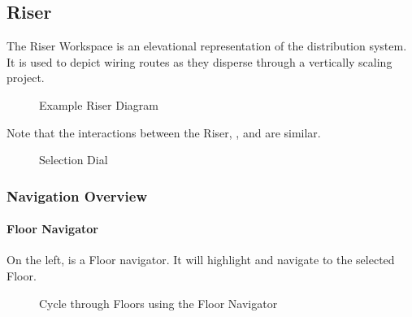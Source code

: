 \documentclass[letterpaper,10pt,english]{sphinxmanual}
\begin{document}
\subsection{Riser}
\label{\detokenize{docs/userguide/index-user_guide:riser}}\label{\detokenize{docs/userguide/buildingelectricalmodel/riser/index-riser:riser}}
The Riser Workspace is an elevational representation of the distribution system.  It is used to depict wiring routes as they disperse through a vertically scaling project.

\begin{figure}[H]
\centering
\capstart

\noindent{}
\caption{Example Riser Diagram}\label{\detokenize{docs/userguide/buildingelectricalmodel/riser/index-riser:id3}}\end{figure}

Note that the interactions between the Riser, {\hyperref[\detokenize{docs/userguide/buildingelectricalmodel/one-line/index-one-line:one-line}]{}}, and {\hyperref[\detokenize{docs/userguide/buildingelectricalmodel/schedules/index-schedules:schedules}]{}} are similar.

\begin{figure}[H]
\centering
\capstart

\noindent{}
\caption{Selection Dial}\label{\detokenize{docs/userguide/buildingelectricalmodel/riser/index-riser:id4}}\end{figure}


\subsubsection{Navigation Overview}
\label{\detokenize{docs/userguide/buildingelectricalmodel/riser/index-riser:navigation-overview}}\label{\detokenize{docs/userguide/buildingelectricalmodel/riser/index-riser::doc}}

\paragraph{Floor Navigator}
\label{\detokenize{docs/userguide/buildingelectricalmodel/riser/index-riser:floor-navigator}}
On the left, is a Floor navigator.  It will highlight and navigate to the selected Floor.

\begin{figure}[H]
\centering
\capstart

\noindent{}
\caption{Cycle through Floors using the Floor Navigator}\label{\detokenize{docs/userguide/buildingelectricalmodel/riser/index-riser:id5}}\end{figure}
\end{document}
